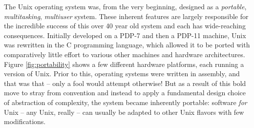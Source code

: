 The Unix operating system was, from the very
beginning, designed as a {\em portable}, {\em
multitasking}, {\em multiuser} system.  These inherent
features are largely responsible for the incredible
success of this over 40 year old system and each has
wide-reaching consequences.  Initially developed on a
PDP-7 and then a PDP-11
machine, Unix was rewritten in the C
programming language, which allowed it to be ported
with comparatively little effort to various other
machines and hardware architectures. Figure
\ref{fig:portability} shows a few different hardware
platforms, each running a version of Unix.  Prior to
this, operating systems were written in assembly, and
that was that -- only a fool would attempt otherwise!
But as a result of this bold move to stray from
convention and instead to apply a fundamental design
choice of abstraction of complexity, the system became
inherently portable: software {\em for} Unix -- any
Unix, really -- can usually be adapted to other Unix
flavors with few modifications.

